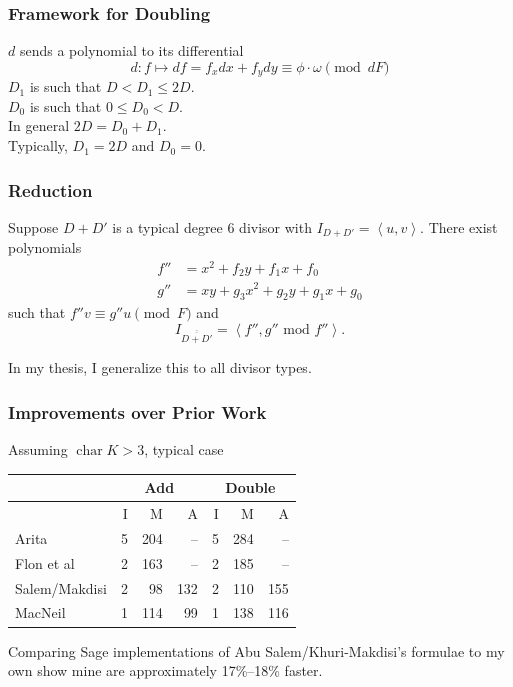 \documentclass{beamer}
\newcommand{\pid}[1]{\left\langle #1 \right\rangle}
\DeclareMathOperator{\Char}{char}
\DeclareMathOperator{\im}{im}
\renewcommand{\bar}{\overline}
\begin{document}

\begin{frame}[fragile]
\frametitle{Framework for Doubling}
  \begin{center}
  \end{center}
  $d$ sends a polynomial to its differential
  \[ d : f \mapsto df = f_xdx + f_ydy \equiv \phi \cdot \omega \pmod{dF} \]
  $D_1$ is such that $D < D_1 \leq 2D$. \\
  $D_0$ is such that $0 \leq D_0 < D$. \\
  In general $2D = D_0 + D_1$. \\
  Typically, $D_1 = 2D$ and $D_0 = 0$.
\end{frame}


\begin{frame}
\frametitle{Reduction}
  \begin{theorem}
    Suppose $D + D'$ is a typical degree 6 divisor with $I_{D + D'} = \pid{u,v}$.
    There exist polynomials
    \begin{align*}
      f'' &= x^2 + f_2y + f_1x + f_0 \\
      g'' &= xy + g_3x^2 + g_2y + g_1x + g_0
    \end{align*}
    such that $f''v \equiv g''u \pmod F$ and
    \[ I_{\bar{\bar{D + D'}}} = \pid{f'', g'' \text{ mod } f''}. \]
  \end{theorem}
  In my thesis, I generalize this to all divisor types.
\end{frame}


\begin{frame}
\frametitle{Improvements over Prior Work}
  Assuming $\Char K > 3$, typical case
  \begin{center}
    \begin{tabular}{l|rrr|rrr}
      & \multicolumn{3}{|c}{Add} & \multicolumn{3}{|c}{Double} \\
      \hline
      & I & M & A & I & M & A \\
      \hline
      Arita         & 5 & 204 &  -- & 5 & 284 & -- \\
      Flon et al    & 2 & 163 &  -- & 2 & 185 &  -- \\
      Salem/Makdisi & 2 &  98 & 132 & 2 & 110 & 155 \\
      MacNeil       & 1 & 114 &  99 & 1 & 138 & 116 
    \end{tabular}
  \end{center}
  Comparing Sage implementations of Abu Salem/Khuri-Makdisi's formulae to my own
  show mine are approximately 17\%--18\% faster.
\end{frame}
\end{document}
